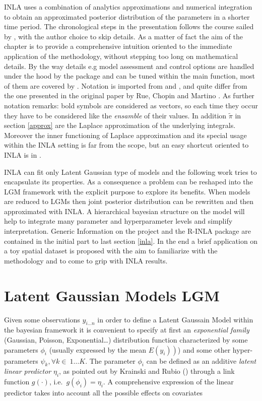 \documentclass[
  12pt,
  a4paper,
  oneside]{book}
\theoremstyle{definition}
\theoremstyle{definition}
\theoremstyle{definition}
\theoremstyle{remark}
\begin{document}
INLA uses a combination of analytics approximations and numerical integration to obtain an approximated posterior distribution of the parameters in a shorter time period.
The chronological steps in the presentation follows the course sailed by \citet{Moraga2019}, with the author choice to skip details. As a matter of fact the aim of the chapter is to provide a comprehensive intuition oriented to the immediate application of the methodology, without stepping too long on mathematical details. By the way details e.g model assessment and control options are handled under the hood by the package and can be tuned within the main function, most of them are covered by \citet{Bayesian_INLA_Rubio}. Notation is imported from \citet{Blangiardo-Cameletti} and \citet{Bayesian_INLA_Rubio}, and quite differ from the one presented in the original paper by Rue, Chopin and Martino \citeyearpar{Rue2009}. As further notation remarks: bold symbols are considered as vectors, so each time they occur they have to be considered like the \emph{ensamble} of their values. In addition \(\tilde\pi\) in section \ref{approx} are the Laplace approximation of the underlying integrals. Moreover the inner functioning of Laplace approximation and its special usage within the INLA setting is far from the scope, but an easy shortcut oriented to INLA is in \citet{Blangiardo-Cameletti}.

INLA can fit only Latent Gaussian type of models and the following work tries to encapsulate its properties. As a consequence a problem can be reshaped into the LGM framework with the explicit purpose to explore its benefits. When models are reduced to LGMs then joint posterior distribution can be rewritten and then approximated with INLA. A hierarchical bayesian structure on the model will help to integrate many parameter and hyperparameter levels and simplify interpretation.
Generic Information on the project and the R-INLA package are contained in the initial part to last section \ref{inla}. In the end a brief application on a toy spatial dataset is proposed with the aim to familiarize with the methodology and to come to grip with INLA results.

\hypertarget{LGM}{%
\section{Latent Gaussian Models LGM}\label{LGM}}

Given some observations \(y_{i \ldots n}\) in order to define a Latent Gaussain Model within the bayesian framework it is convenient to specify at first an \emph{exponential family} (Gaussian, Poisson, Exponential\ldots) distribution function characterized by some parameters \(\phi_{i}\) (usually expressed by the mean \(\left.E\left(y_{i}\right)\right)\)) and some other hyper-parameters \(\psi_{k} ,\forall k \in \ 1\ldots K\). The parameter \(\phi_{i}\) can be defined as an additive \emph{latent linear predictor} \(\eta_{i}\), as pointed out by Krainski and Rubio (\citeyearpar{Krainski-Rubio}) through a link function \(g(\cdot)\), i.e.~\(g\left(\phi_{i}\right)=\eta_{i}\). A comprehensive expression of the linear predictor takes into account all the possible effects on covariates
\end{document}
